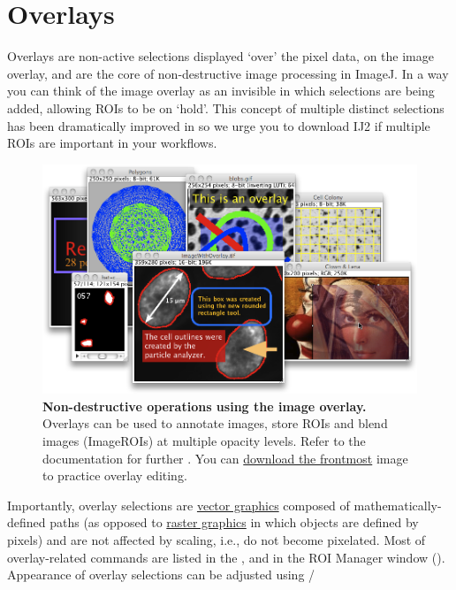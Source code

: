 

\section[Overlays]{Overlays\label{sub:Overlay-Intro}}

Overlays
are non-active selections displayed `over' the pixel data, on the
image overlay, and are the core of non-destructive image processing
in ImageJ. In a way you can think of the image overlay as an invisible
 in which selections are being added,
allowing ROIs to be on `hold'. This concept of multiple distinct
selections has been dramatically improved in 
so we urge you to download IJ2 if multiple ROIs are important in your
workflows.
\begin{figure}
\noindent \includegraphics[width=0.75\columnwidth]{images/OverlayShowcase}\caption{\textbf{Non-destructive operations using the image overlay.} Overlays
can be used to annotate images, store ROIs and blend images (ImageROIs)
at multiple opacity levels. Refer to the \protect{}documentation
for further . You can \protect\href{http://imagej.nih.gov/ij/docs/guide/images/ImageWithOverlay.tif}{download the frontmost}
image to practice overlay editing. }
\end{figure}


Importantly, overlay selections are \href{http://en.wikipedia.org/wiki/Vector_graphics}{vector graphics}
composed of mathematically-defined paths (as opposed to \href{http://en.wikipedia.org/wiki/Raster_graphics}{raster graphics}
in which objects are defined by pixels) and are not affected by scaling,
i.e., do not become pixelated. Most of overlay-related commands are
listed in the ,
and in the ROI Manager window ().
Appearance of overlay selections can be adjusted using /

